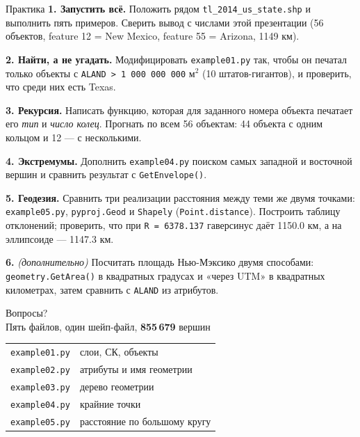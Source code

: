 \documentclass[aspectratio=169,10pt]{beamer}
\newcommand{\num}[1]{\textcolor{codered}{\textbf{#1}}}
\begin{document}
\begin{frame}[fragile]{Практика}
\footnotesize
\textbf{1. Запустить всё.} Положить рядом \texttt{tl\_2014\_us\_state.shp}
и выполнить пять примеров. Сверить вывод с числами этой презентации
(56 объектов, feature 12 = New Mexico, feature 55 = Arizona, 1149 км).

\textbf{2. Найти, а не угадать.} Модифицировать \texttt{example01.py}
так, чтобы он печатал только объекты с
\texttt{ALAND > 1\,000\,000\,000} м$^2$ (10 штатов-гигантов), и проверить,
что среди них есть Texas.

\textbf{3. Рекурсия.} Написать функцию, которая для заданного номера
объекта печатает его \emph{тип} и \emph{число колец}. Прогнать по всем
56 объектам: 44 объекта с одним кольцом и 12 --- с несколькими.

\textbf{4. Экстремумы.} Дополнить \texttt{example04.py} поиском самых
западной и восточной вершин и сравнить результат с
\texttt{GetEnvelope()}.

\textbf{5. Геодезия.} Сравнить три реализации расстояния между теми же
двумя точками: \texttt{example05.py}, \texttt{pyproj.Geod} и
\texttt{Shapely} (\texttt{Point.distance}). Построить таблицу отклонений;
проверить, что при \texttt{R = 6378.137} гаверсинус даёт 1150.0 км, а на
эллипсоиде --- 1147.3 км.

\textbf{6.} \textit{(дополнительно)} Посчитать площадь Нью-Мэксико двумя
способами: \texttt{geometry.GetArea()} в квадратных градусах и «через UTM»
в квадратных километрах, затем сравнить с \texttt{ALAND} из атрибутов.
\end{frame}

\begin{frame}
  \begin{center}
    {\Huge Вопросы?}\\[1.2em]
    {\large Пять файлов, один шейп-файл, \num{855\,679} вершин}\\[0.8em]
    {\normalsize
     \begin{tabular}{ll}
       \texttt{example01.py} & слои, СК, объекты \\
       \texttt{example02.py} & атрибуты и имя геометрии \\
       \texttt{example03.py} & дерево геометрии \\
       \texttt{example04.py} & крайние точки \\
       \texttt{example05.py} & расстояние по большому кругу
     \end{tabular}}
  \end{center}
\end{frame}
\end{document}
